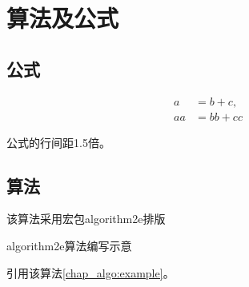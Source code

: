 \chapter{算法及公式}

\section{公式}

\begin{align}
a &= b+c, \\
aa &= bb+cc
\end{align}

公式的行间距1.5倍。

\section{算法}

\begin{algorithm}[!htb]
	该算法采用宏包algorithm2e排版\;
	\BlankLine
	 {
	}
	\caption{algorithm2e算法编写示意}
	\label{chap_algo:example}
\end{algorithm}

引用该算法\ref*{chap_algo:example}。